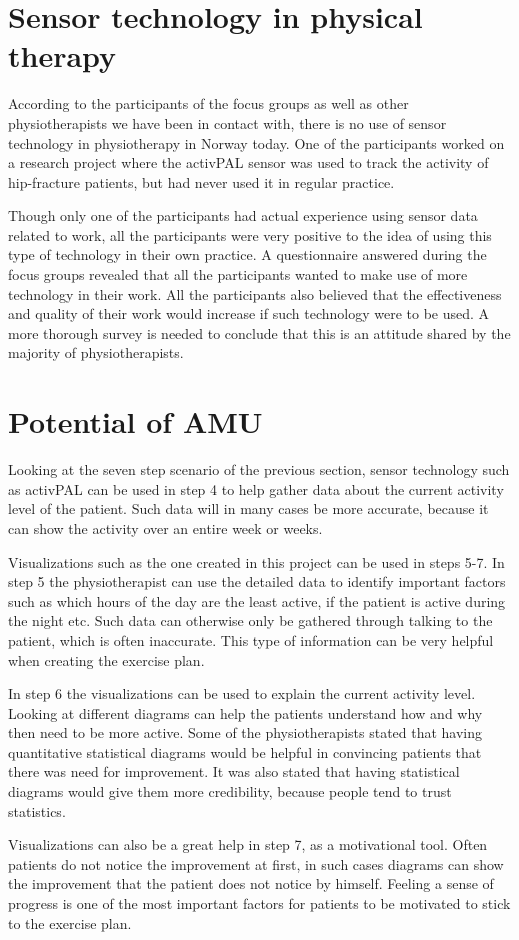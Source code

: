 \section{Sensor technology in physical therapy}
According to the participants of the focus groups as well as other physiotherapists we have been in contact with, there is no use of sensor technology in physiotherapy in Norway today. One of the participants worked on a research project where the activPAL sensor was used to track the activity of hip-fracture patients, but had never used it in regular practice. 

Though only one of the participants had actual experience using sensor data related to work, all the participants were very positive to the idea of using this type of technology in their own practice. A questionnaire answered during the focus groups revealed that all the participants wanted to make use of more technology in their work. All the participants also believed that the effectiveness and quality of their work would increase if such technology were to be used. A more thorough survey is needed to conclude that this is an attitude shared by the majority of physiotherapists.

\section{Potential of AMU}
Looking at the seven step scenario of the previous section, sensor technology such as activPAL can be used in step 4 to help gather data about the current activity level of the patient. Such data will in many cases be more accurate, because it can show the activity over an entire week or weeks.

Visualizations such as the one created in this project can be used in steps 5-7. In step 5 the physiotherapist can use the detailed data to identify important factors such as which hours of the day are the least active, if the patient is active during the night etc. Such data can otherwise only be gathered through talking to the patient, which is often inaccurate. This type of information can be very helpful when creating the exercise plan.

In step 6 the visualizations can be used to explain the current activity level. Looking at different diagrams can help the patients understand how and why then need to be more active. Some of the physiotherapists stated that having quantitative statistical diagrams would be helpful in convincing patients that there was need for improvement. It was also stated that having statistical diagrams would give them more credibility, because people tend to trust statistics. 

Visualizations can also be a great help in step 7, as a motivational tool. Often patients do not notice the improvement at first, in such cases diagrams can show the improvement that the patient does not notice by himself. Feeling a sense of progress is one of the most important factors for patients to be motivated to stick to the exercise plan.
